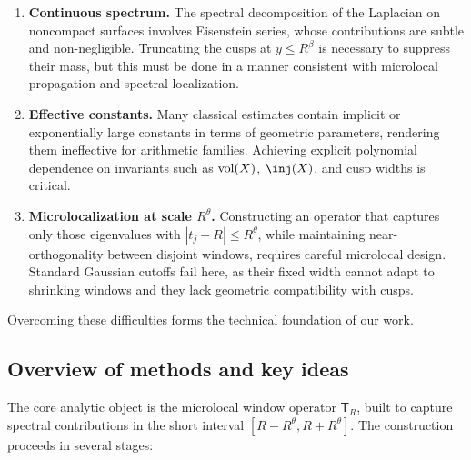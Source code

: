 \begin{enumerate}
  \item \textbf{Continuous spectrum.} The spectral decomposition of the Laplacian on 
        noncompact surfaces involves Eisenstein series, whose contributions are subtle 
        and non-negligible. Truncating the cusps at $y \leq R^\beta$ is necessary to 
        suppress their mass, but this must be done in a manner consistent with microlocal 
        propagation and spectral localization.
  \item \textbf{Effective constants.} Many classical estimates contain implicit or 
        exponentially large constants in terms of geometric parameters, rendering them 
        ineffective for arithmetic families. Achieving explicit polynomial dependence on 
        invariants such as $\operatorname{vol}(X)$, $\inj(X)$, and cusp widths is critical.
  \item \textbf{Microlocalization at scale $R^\theta$.} Constructing an operator that 
        captures only those eigenvalues with $|t_j - R|\leq R^\theta$, while maintaining 
        near-orthogonality between disjoint windows, requires careful microlocal design. 
        Standard Gaussian cutoffs fail here, as their fixed width cannot adapt to shrinking 
        windows and they lack geometric compatibility with cusps.
\end{enumerate}

Overcoming these difficulties forms the technical foundation of our work.

\subsection{Overview of methods and key ideas}\label{subsec:methods}

The core analytic object is the microlocal window operator $\mathsf{T}_R$, built to 
capture spectral contributions in the short interval $[R-R^\theta, R+R^\theta]$. The 
construction proceeds in several stages:

